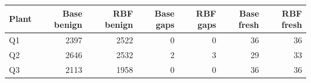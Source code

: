 \begin{tabular}{lrrrrrr}\toprule
Plant & Base benign & RBF benign & Base gaps & RBF gaps & Base fresh & RBF fresh \\\midrule
Q1 & 2397 & 2522 & 0 & 0 & 36 & 36 \\
Q2 & 2646 & 2532 & 2 & 3 & 29 & 33 \\
Q3 & 2113 & 1958 & 0 & 0 & 36 & 36 \\
\bottomrule\end{tabular}
